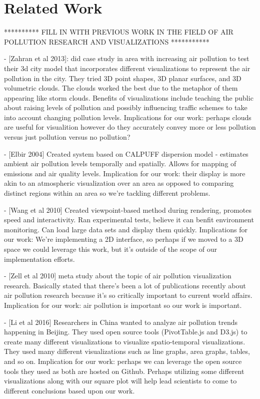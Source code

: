 \documentclass[journal]{vgtc}                %
\begin{document}
\section{Related Work}
********** FILL IN WITH PREVIOUS WORK IN THE FIELD OF AIR POLLUTION RESEARCH AND VISUALIZATIONS ***********

- [Zahran et al 2013]: did case study in area with increasing air pollution to test their 3d city model that incorporates different visualizations to represent the air pollution in the city. They tried 3D point shapes, 3D planar surfaces, and 3D volumetric clouds. The clouds worked the best due to the metaphor of them appearing like storm clouds. Benefits of visualizations include teaching the public about raising levels of pollution and possibly influencing traffic schemes to take into account changing pollution levels. Implications for our work: perhaps clouds are useful for visualition however do they accurately convey more or less pollution versus just pollution versus no pollution?

- [Elbir 2004] Created system based on CALPUFF dispersion model - estimates ambient air pollution levels temporally and spatially. Allows for mapping of emissions and air quality levels. Implication for our work: their display is more akin to an atmospheric visualization over an area as opposed to comparing distinct regions within an area so we're tackling different problems.

- [Wang et al 2010] Created viewpoint-based method during rendering, promotes speed and interactivity. Ran experimental tests, believe it can benfit environment monitoring. Can load large data sets and display them quickly. Implications for our work: We're implementing a 2D interface, so perhaps if we moved to a 3D space we could leverage this work, but it's outside of the scope of our implementation efforts.

- [Zell et al 2010] meta study about the topic of air pollution visualization research. Basically stated that there's been a lot of publications recently about air pollution research because it's so critically important to current world affairs. Implication for our work: air pollution is important so our work is important.

- [Li et al 2016] Researchers in China wanted to analyze air pollution trends happening in Beijing. They used open source tools (PivotTable.js and D3.js) to create many different visualizations to visualize spatio-temporal visualizations. They used many different visualizations such as line graphs, area graphs, tables, and so on. Implication for our work: perhaps we can leverage the open source tools they used as both are hosted on Github. Perhaps utilizing some different visualizations along with our square plot will help lead scientists to come to different conclusions based upon our work.
\end{document}
